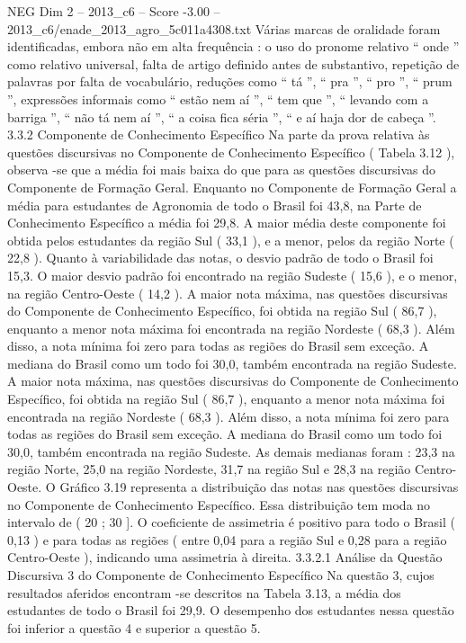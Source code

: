 \begin{textsample}{NEG Dim 2 – 2013\_c6 – Score -3.00 – 2013\_c6/enade\_2013\_agro\_5c011a4308.txt}
Várias marcas de oralidade foram identificadas, embora não em alta frequência : o uso do pronome relativo “ onde ” como relativo universal, falta de artigo definido antes de substantivo, repetição de palavras por falta de vocabulário, reduções como “ tá ”, “ pra ”, “ pro ”, “ prum ”, expressões informais como “ estão nem aí ”, “ tem que ”, “ levando com a barriga ”, “ não tá nem aí ”, “ a coisa fica séria ”, “ e aí haja dor de cabeça ”. 3.3.2 Componente de Conhecimento Específico Na parte da prova relativa às questões discursivas no Componente de Conhecimento Específico ( Tabela 3.12 ), observa -se que a média foi mais baixa do que para as questões discursivas do Componente de Formação Geral.
Enquanto no Componente de Formação Geral a média para estudantes de Agronomia de todo o Brasil foi 43,8, na Parte de Conhecimento Específico a média foi 29,8.
A maior média deste componente foi obtida pelos estudantes da região Sul ( 33,1 ), e a menor, pelos da região Norte ( 22,8 ).
Quanto à variabilidade das notas, o desvio padrão de todo o Brasil foi 15,3.
O maior desvio padrão foi encontrado na região Sudeste ( 15,6 ), e o menor, na região Centro-Oeste ( 14,2 ).
A maior nota máxima, nas questões discursivas do Componente de Conhecimento Específico, foi obtida na região Sul ( 86,7 ), enquanto a menor nota máxima foi encontrada na região Nordeste ( 68,3 ).
Além disso, a nota mínima foi zero para todas as regiões do Brasil sem exceção.
A mediana do Brasil como um todo foi 30,0, também encontrada na região Sudeste.
A maior nota máxima, nas questões discursivas do Componente de Conhecimento Específico, foi obtida na região Sul ( 86,7 ), enquanto a menor nota máxima foi encontrada na região Nordeste ( 68,3 ).
Além disso, a nota mínima foi zero para todas as regiões do Brasil sem exceção.
A mediana do Brasil como um todo foi 30,0, também encontrada na região Sudeste.
As demais medianas foram : 23,3 na região Norte, 25,0 na região Nordeste, 31,7 na região Sul e 28,3 na região Centro-Oeste.
O Gráfico 3.19 representa a distribuição das notas nas questões discursivas no Componente de Conhecimento Específico.
Essa distribuição tem moda no intervalo de ( 20 ; 30 ].
O coeficiente de assimetria é positivo para todo o Brasil ( 0,13 ) e para todas as regiões ( entre 0,04 para a região Sul e 0,28 para a região Centro-Oeste ), indicando uma assimetria à direita. 3.3.2.1 Análise da Questão Discursiva 3 do Componente de Conhecimento Específico Na questão 3, cujos resultados aferidos encontram -se descritos na Tabela 3.13, a média dos estudantes de todo o Brasil foi 29,9.
O desempenho dos estudantes nessa questão foi inferior a questão 4 e superior a questão 5.

\end{textsample}
